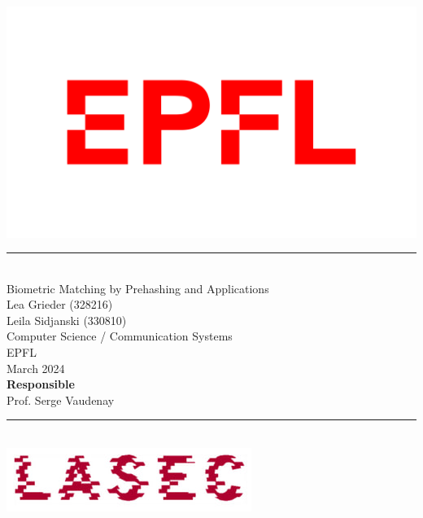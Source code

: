 \documentclass[12pt, a4paper, openany]{article}
\begin{document}
\begin{titlepage}
  \centering
  \includegraphics[width=0.3\linewidth]{latex-img/logo-epfl.png}\\[0.2cm]
  \rule{\textwidth}{0.4pt}\\[2cm]
  {\LARGE Biometric Matching by Prehashing and Applications}\\[2cm]
  {\normalsize Lea Grieder (328216)\\[0.2cm]Leila Sidjanski (330810)}\\[2cm]
  {\normalsize Computer Science / Communication Systems\\[0.2cm]EPFL}\\[2cm]
  {\normalsize March 2024}\\[2cm]

  {\normalsize\bfseries Responsible}\\[0.2cm]
  {\normalsize Prof. Serge Vaudenay}\\[2cm]
  \rule{\textwidth}{0.3pt}\\[1cm]
  \includegraphics[width=0.3\linewidth]{latex-img/lasec.jpg}\\[0.2cm]
\end{titlepage}


\newpage
\tableofcontents
\thispagestyle{fancy}

\newpage









\newpage
\printbibliography[heading=bibintoc, title={References}]
\end{document}
